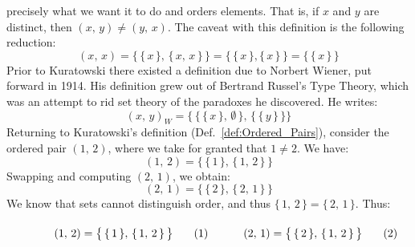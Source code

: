         precisely what we want it to do and orders elements. That is, if
        $x$ and $y$ are distinct, then $(x,\,y)\ne(y,\,x)$. The caveat with
        this definition is the following reduction:
        \begin{equation}
            (x,\,x)
            =\big\{\,\{\,x\,\},\,\{\,x,\,x\,\}\,\big\}
            =\big\{\,\{\,x\,\},\{\,x\,\}\,\big\}
            =\big\{\,\{\,x\,\}\,\big\}
        \end{equation}
        Prior to Kuratowski there existed a definition due to Norbert Wiener,
        put forward in 1914. His definition grew out of Bertrand Russel's Type
        Theory, which was an attempt to rid set theory of the paradoxes he
        discovered. He writes:
        \begin{equation}
            (x,\,y)_{W}=\Big\{\,\big\{\,\{\,x\,\},\,\emptyset\,\big\},\,
                                \big\{\,\{\,y\,\}\,\big\}\Big\}
        \end{equation}
        Returning to Kuratowski's definition (Def.~\ref{def:Ordered_Pairs}),
        consider the ordered pair $(1,\,2)$, where we take for granted that
        $1\ne{2}$. We have:
        \begin{equation}
            (1,\,2)=\big\{\,\{\,1\,\},\,\{\,1,\,2\,\}\,\big\}
        \end{equation}
        Swapping and computing $(2,\,1)$, we obtain:
        \begin{equation}
            (2,\,1)=\big\{\,\{\,2\,\},\,\{\,2,\,1\,\}\,\big\}
        \end{equation}
        We know that sets cannot distinguish order, and thus
        $\{\,1,\,2\,\}=\{\,2,\,1\,\}$. Thus:
        \par
        \begin{subequations}
            \begin{minipage}[b]{0.49\textwidth}
                \begin{equation}
                    (1,\,2)=\big\{\,\{\,1\,\},\,\{\,1,\,2\,\}\,\big\}
                \end{equation}
            \end{minipage}
            \hfill
            \begin{minipage}[b]{0.49\textwidth}
                \begin{equation}
                    (2,\,1)=\big\{\,\{\,2\,\},\,\{\,1,\,2\,\}\,\big\}
                \end{equation}
            \end{minipage}
        \end{subequations}
